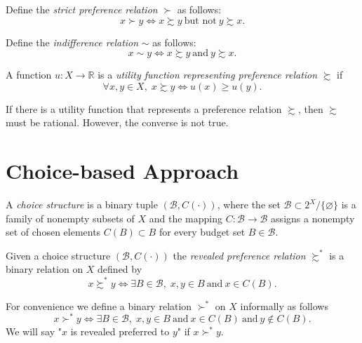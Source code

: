 \documentclass[12pt,fleqn]{book} %
\begin{document}
\begin{definition}
	Define the \emph{strict preference relation} $\succ$ as follows:
	\[	
	x\succ y \Longleftrightarrow x\succsim y \ \text{but not}\  y\succsim x.
	\]
\end{definition}

\begin{definition}
	Define the \emph{indifference relation} $\sim$ as follows:
	\[	
	x\sim y \Longleftrightarrow x\succsim y \ \text{and}\  y\succsim x.
	\]
\end{definition}

\begin{definition}
    A function $u:X\rightarrow\mathbb{R}$ is a \emph{utility function representing preference relation} $\succsim$ if
    \[
    \forall x,y\in X,\;x\succsim y\Longleftrightarrow u(x)\ge u(y).
    \]
\end{definition}

\begin{proposition}
	If there is a utility function that represents a preference relation $\succsim$, then $\succsim$ must be rational. However, the converse is not true.
\end{proposition}


\section{Choice-based Approach}

\begin{definition}
	A \emph{choice structure} is a binary tuple $(\mathcal{B},C(\cdot))$, where the set $\mathcal{B}\subset 2^X\slash \{\varnothing\}$ is a family of nonempty subsets of $X$ and the mapping $C:\mathcal{B}\rightarrow \mathcal{B}$ assigns a nonempty set of chosen elements $C(B)\subset B$ for every budget set $B\in\mathcal{B}$.
\end{definition}

\begin{definition}
	Given a choice structure $(\mathcal{B},C(\cdot))$ the \emph{revealed preference relation} $\succsim^*$ is a binary relation on $X$ defined by
	\[
	x\succsim^*y\Longleftrightarrow \exists B\in\mathcal{B},\;x,y\in B \ \text{and}\  x\in C(B).
	\]
\end{definition}

\begin{remark}
	For convenience we define a binary relation $\succ^*$ on $X$ informally as follows 
	\[
	x\succ^*y\Longleftrightarrow \exists B\in\mathcal{B},\;x,y\in B \ \text{and}\  x\in C(B) \ \text{and}\ y\notin C(B).
	\]
	We will say "$x$ is revealed preferred to $y$" if $x\succ^*y$.
\end{remark}
\end{document}
